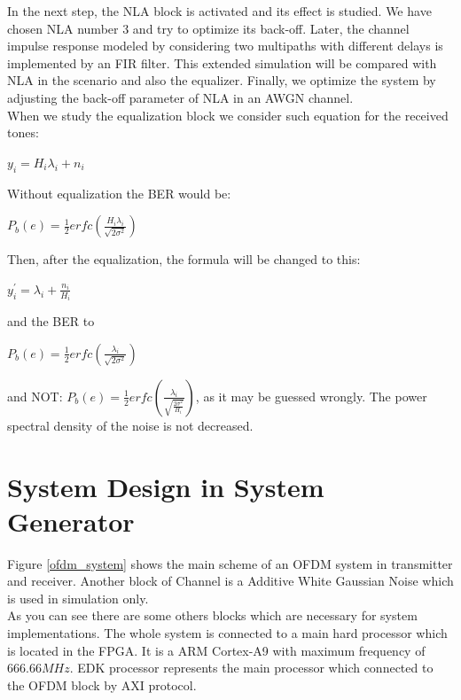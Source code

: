 In the next step, the NLA block is activated and its effect is studied. We have chosen NLA number 3 and try to optimize its back-off.
Later, the channel impulse response modeled by considering two multipaths with different delays is implemented by an FIR filter. This extended simulation will be compared with NLA in the scenario and also the equalizer. Finally, we optimize the system by adjusting the back-off parameter of NLA in an AWGN channel.\\
When we study the equalization block we consider such equation for the received tones:
\begin{center}
$y_{i}= H_{i} \lambda_{i} + n_{i}$\\
\end{center}
Without equalization the BER would be:
\begin{center}
$P_{b}(e)= \frac{1}{2}erfc(\frac{H_{i} \lambda_{i}}{\sqrt{2 \sigma^{2}}})$\\
\end{center}
Then, after the equalization, the formula will be changed to this:\\
\begin{center}
$y^{\prime}_{i}= \lambda_{i} + \frac{n_{i}}{H_{i}}$\\
\end{center}
and the BER to
\begin{center}
 $P_{b}(e)= \frac{1}{2}erfc(\frac{\lambda_{i}}{\sqrt{2 \sigma^{2}}})$\\
\end{center}
and NOT: $P_{b}(e)= \frac{1}{2}erfc(\frac{\lambda_{i}}{\sqrt{\frac{2 \sigma^{2}}{H_{i}}}})$, as it may be guessed wrongly. The power spectral density of the noise is not decreased.
\section{System Design in System Generator}
\label{sec_anasim}

Figure \ref{ofdm_system} shows the main scheme of an OFDM system in transmitter and receiver. Another block of Channel is a Additive White Gaussian Noise which is used in simulation only.\\
As you can see there are some others blocks which are necessary for system implementations. The whole system is connected to a main hard processor which is located in the FPGA. It is a ARM Cortex-A9 with maximum frequency of $666.66 MHz$. EDK processor represents the main processor which connected to the OFDM block by AXI protocol. 

